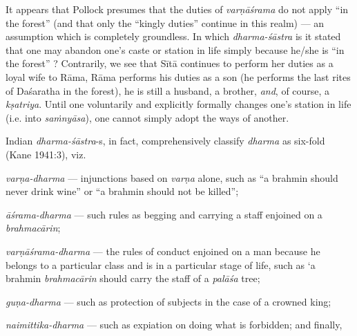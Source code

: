 It appears that Pollock presumes that the duties of {\sl varṇāśrama} do not apply “in the forest” (and that only the “kingly duties” continue in this realm) --- an assumption which is completely groundless. In which {\sl dharma-śāstra} is it stated that one may abandon one’s caste or station in life simply because he/she is “in the forest” ? Contrarily, we see that Sītā continues to perform her duties as a loyal wife to Rāma, Rāma performs his duties as a son (he performs the last rites of Daśaratha in the forest), he is still a husband, a brother, {\sl and}, of course, a {\sl kṣatriya}. Until one voluntarily and explicitly formally changes one’s station in life (i.e. into {\sl saṁnyāsa}), one cannot simply adopt the ways of another. 

Indian {\sl dharma-śāstra}-s, in fact, comprehensively classify {\sl dharma} as six-fold (Kane 1941:3), viz. 

{\sl varṇa-dharma}
 --- injunctions based on {\sl varṇa} alone, such as “a brahmin should never drink wine” or “a brahmin should not be killed”; 

{\sl āśrama-dharma}  --- such rules as begging and carrying a staff enjoined on a {\sl brahmacārin};
  
{\sl varṇāśrama-dharma} --- the rules of conduct enjoined on a man because he belongs to a particular class and is in a particular stage of life, such as ‘a brahmin {\sl brahmacārin} should carry the staff of a {\sl palāśa} tree; 

{\sl guṇa-dharma} --- such as protection of subjects in the case of a crowned king; 

\newpage

{\sl naimittika-dharma} --- such as expiation on doing what is forbidden; and finally, 

